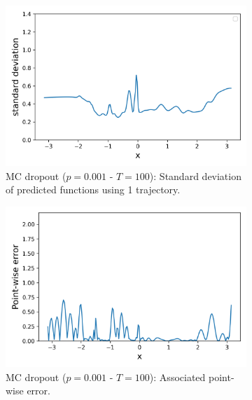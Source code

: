 \begin{figure}[H]
	\begin{subfigure}[b]{.45\textwidth}
		\centering
		\includegraphics[width=1\linewidth]{./figs/mcdrop_001_std.png}  
		\caption{MC dropout ($p = 0.001$ - $T=100$): Standard deviation of predicted functions using 1 trajectory.}
	\end{subfigure}
	\begin{subfigure}[b]{.45\textwidth}
		\centering
		\includegraphics[width=1\linewidth]{./figs/mcdrop_001_err.png}  
		\caption{MC dropout ($p = 0.001$ - $T=100$): Associated point-wise error. \newline}
	\end{subfigure}
	\begin{subfigure}[b]{.45\textwidth}
		\centering

\end{subfigure}
\end{figure}
